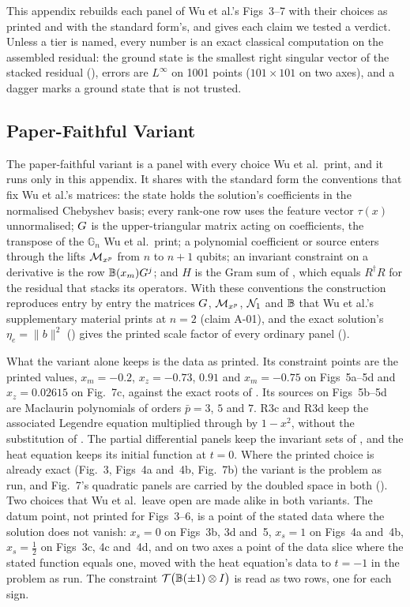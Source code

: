This appendix rebuilds each panel of Wu et al.'s Figs~3--7 \cite{wu2025pihm} with their choices as printed and with the standard form's, and gives each claim we tested a verdict. Unless a tier is named, every number is an exact classical computation on the assembled residual: the ground state is the smallest right singular vector of the stacked residual (), errors are $L^\infty$ on 1001 points ($101\times101$ on two axes), and a dagger marks a ground state that is not trusted.

\subsection{Paper-Faithful Variant}
\label{app:faithful-conventions}

The paper-faithful variant is a panel with every choice Wu et al.\ print, and it runs only in this appendix. It shares with the standard form the conventions that fix Wu et al.'s matrices: the state holds the solution's coefficients in the normalised Chebyshev basis; every rank-one row uses the feature vector $\tau(x)$ unnormalised; $G$ is the upper-triangular matrix acting on coefficients, the transpose of the $\mathbb{G}_n$ Wu et al.\ print; a polynomial coefficient or source enters through the lifts $\mathcal{M}_{x^p}$ from $n$ to $n+1$ qubits; an invariant constraint on a derivative is the row $\mathbb{B}(x_m)G^{j}$; and $H$ is the Gram sum of , which equals $R^\dagger R$ for the residual that stacks its operators. With these conventions the construction reproduces entry by entry the matrices $G$, $\mathcal{M}_{x^p}$, $\mathcal{N}_1$ and $\mathbb{B}$ that Wu et al.'s supplementary material prints at $n=2$ (claim A-01), and the exact solution's $\eta_e=\|b\|^2$ () gives the printed scale factor of every ordinary panel ().

What the variant alone keeps is the data as printed. Its constraint points are the printed values, $x_m=-0.2$, $x_z=-0.73$, $0.91$ and $x_m=-0.75$ on Figs~5a--5d and $x_z=0.02615$ on Fig.~7c, against the exact roots of . Its sources on Figs~5b--5d are Maclaurin polynomials of orders $\bar p=3$, $5$ and $7$. R3c and R3d keep the associated Legendre equation multiplied through by $1-x^2$, without the substitution of . The partial differential panels keep the invariant sets of , and the heat equation keeps its initial function at $t=0$. Where the printed choice is already exact (Fig.~3, Figs~4a and~4b, Fig.~7b) the variant is the problem as run, and Fig.~7's quadratic panels are carried by the doubled space in both (). Two choices that Wu et al.\ leave open are made alike in both variants. The datum point, not printed for Figs~3--6, is a point of the stated data where the solution does not vanish: $x_s=0$ on Figs~3b, 3d and~5, $x_s=1$ on Figs~4a and~4b, $x_s=\tfrac12$ on Figs~3c, 4c and~4d, and on two axes a point of the data slice where the stated function equals one, moved with the heat equation's data to $t=-1$ in the problem as run. The constraint $\mathcal T\bigl(\mathbb{B}(\pm1)\otimes I\bigr)$ is read as two rows, one for each sign.

